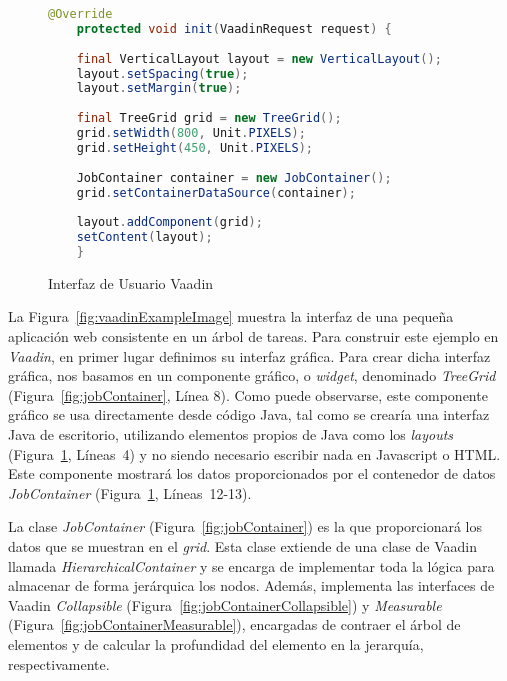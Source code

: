 \begin{figure}[!tb]
	\centering
	\begin{lstlisting}[language=Java]
	@Override
	protected void init(VaadinRequest request) {
	
	final VerticalLayout layout = new VerticalLayout();
	layout.setSpacing(true);
	layout.setMargin(true);
	
	final TreeGrid grid = new TreeGrid();
	grid.setWidth(800, Unit.PIXELS);
	grid.setHeight(450, Unit.PIXELS);
	
	JobContainer container = new JobContainer();
	grid.setContainerDataSource(container);
	
	layout.addComponent(grid);
	setContent(layout);
	}
	\end{lstlisting}
	\vspace{-15pt}
	\caption{Interfaz de Usuario Vaadin}
	\label{fig:uiVaadin}
\end{figure}

La Figura~\ref{fig:vaadinExampleImage} muestra la interfaz de una pequeña aplicación web consistente en un árbol de tareas. Para construir este ejemplo en \emph{Vaadin}, en primer lugar definimos su interfaz gráfica. Para crear dicha interfaz gráfica, nos basamos en un componente gráfico, o \emph{widget}, denominado \emph{TreeGrid}  (Figura~\ref{fig:jobContainer}, Línea 8). Como puede observarse, este componente gráfico se usa directamente desde código Java, tal como se crearía una interfaz Java de escritorio, utilizando elementos propios de Java como los \emph{layouts} (Figura~\ref{fig:uiVaadin}, Líneas~4) y no siendo necesario escribir nada en Javascript o HTML. Este componente mostrará los datos proporcionados por el contenedor de datos \emph{JobContainer} (Figura~\ref{fig:uiVaadin}, Líneas~12-13).

La clase \emph{JobContainer} (Figura~\ref{fig:jobContainer}) es la que proporcionará los datos que se muestran en el \emph{grid}. Esta clase extiende de una clase de Vaadin llamada \emph{HierarchicalContainer} y se encarga de implementar toda la lógica para almacenar de forma jerárquica los nodos. Además, implementa las interfaces de Vaadin \emph{Collapsible} (Figura~\ref{fig:jobContainerCollapsible}) y \emph{Measurable} (Figura~\ref{fig:jobContainerMeasurable}), encargadas de contraer el árbol de elementos y de calcular la profundidad del elemento en la jerarquía, respectivamente.

